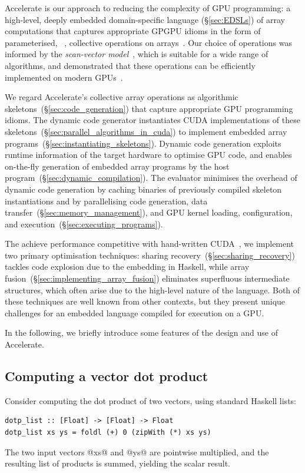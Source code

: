 Accelerate is our approach to reducing the complexity of GPU programming: a
high-level, deeply embedded domain-specific language (\S\ref{sec:EDSLs}) of
array computations that captures appropriate GPGPU idioms in the form of
parameterised, ~\cite{Keller:2010er}, collective
operations on arrays~\cite{Chakravarty:2011fr}. Our choice of operations was
informed by the \emph{scan-vector model}~\cite{Chatterjee:1990vj}, which is
suitable for a wide range of algorithms, and demonstrated that these operations
can be efficiently implemented on modern GPUs~\cite{Sengupta:2007tc}.

We regard Accelerate's collective array operations as algorithmic
skeletons~(\S\ref{sec:code_generation}) that capture appropriate GPU programming
idioms. The dynamic code generator instantiates CUDA implementations of these
skeletons~(\S\ref{sec:parallel_algorithms_in_cuda}) to implement embedded array
programs~(\S\ref{sec:instantiating_skeletons}). Dynamic code generation exploits
runtime information of the target hardware to optimise GPU code, and enables
on-the-fly generation of embedded array programs by the host
program~(\S\ref{sec:dynamic_compilation}). The evaluator minimises the overhead
of dynamic code generation by caching binaries of previously compiled skeleton
instantiations and by parallelising code generation, data
transfer~(\S\ref{sec:memory_management}), and GPU kernel loading, configuration,
and execution~(\S\ref{sec:executing_programs}).

The achieve performance competitive with hand-written
CUDA~\cite{McDonell:2013wi}, we implement two primary optimisation techniques:
sharing recovery~(\S\ref{sec:sharing_recovery}) tackles code explosion due to
the embedding in Haskell, while array
fusion~(\S\ref{sec:implementing_array_fusion}) eliminates superfluous
intermediate structures, which often arise due to the high-level nature of the
language. Both of these techniques are well known from other contexts, but they
present unique challenges for an embedded language compiled for execution on a
GPU.

In the following, we briefly introduce some features of the design and use of
Accelerate.


\subsection{Computing a vector dot product}
\label{sec:computing_dotp}

Consider computing the dot product of two vectors, using standard Haskell lists:
%
\begin{lstlisting}[style=haskell]
dotp_list :: [Float] -> [Float] -> Float
dotp_list xs ys = foldl (+) 0 (zipWith (*) xs ys)
\end{lstlisting}
%
The two input vectors @xs@ and @ys@ are pointwise multiplied, and the resulting
list of products is summed, yielding the scalar result.

